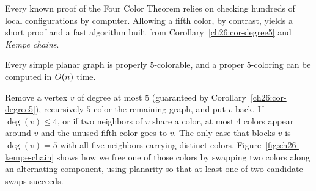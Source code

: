 Every known proof of the Four Color Theorem relies on checking hundreds of local
configurations by computer. Allowing a fifth color, by contrast, yields a short proof and a
fast algorithm built from Corollary~\ref{ch26:cor-degree5} and \emph{Kempe chains}.

\begin{theorem}
\label{ch26:thm-5ct}
Every simple planar graph is properly $5$-colorable, and a proper $5$-coloring can be
computed in $O(n)$ time.
\end{theorem}

\begin{intuitionbox}
Remove a vertex $v$ of degree at most $5$ (guaranteed by Corollary~\ref{ch26:cor-degree5}),
recursively $5$-color the remaining graph, and put $v$ back. If $\deg(v)\le 4$, or if two
neighbors of $v$ share a color, at most $4$ colors appear around $v$ and the unused fifth
color goes to $v$. The only case that blocks $v$ is $\deg(v)=5$ with all five neighbors
carrying distinct colors. Figure~\ref{fig:ch26-kempe-chain} shows how we free one of those
colors by swapping two colors along an alternating component, using planarity so that at
least one of two candidate swaps succeeds.
\end{intuitionbox}

